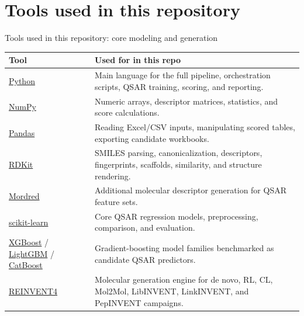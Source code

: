 \documentclass[aspectratio=169,10pt]{beamer}
\begin{document}
\section{Tools used in this repository}

\begin{frame}{Tools used in this repository: core modeling and generation}
  \scriptsize
  \begin{tabularx}{\textwidth}{lX}
    \toprule
    \textbf{Tool} & \textbf{Used for in this repo} \\
    \midrule
    \href{https://www.python.org/}{Python} & Main language for the full pipeline, orchestration scripts, QSAR training, scoring, and reporting. \\
    \href{https://numpy.org/}{NumPy} & Numeric arrays, descriptor matrices, statistics, and score calculations. \\
    \href{https://pandas.pydata.org/}{Pandas} & Reading Excel/CSV inputs, manipulating scored tables, exporting candidate workbooks. \\
    \href{https://www.rdkit.org/}{RDKit} & SMILES parsing, canonicalization, descriptors, fingerprints, scaffolds, similarity, and structure rendering. \\
    \href{https://github.com/mordred-descriptor/mordred}{Mordred} & Additional molecular descriptor generation for QSAR feature sets. \\
    \href{https://scikit-learn.org/}{scikit-learn} & Core QSAR regression models, preprocessing, comparison, and evaluation. \\
    \href{https://xgboost.readthedocs.io/}{XGBoost} / \href{https://lightgbm.readthedocs.io/}{LightGBM} / \href{https://catboost.ai/}{CatBoost} & Gradient-boosting model families benchmarked as candidate QSAR predictors. \\
    \href{https://github.com/MolecularAI/REINVENT4}{REINVENT4} & Molecular generation engine for de novo, RL, CL, Mol2Mol, LibINVENT, LinkINVENT, and PepINVENT campaigns. \\
    \bottomrule
  \end{tabularx}
\end{frame}
\end{document}
